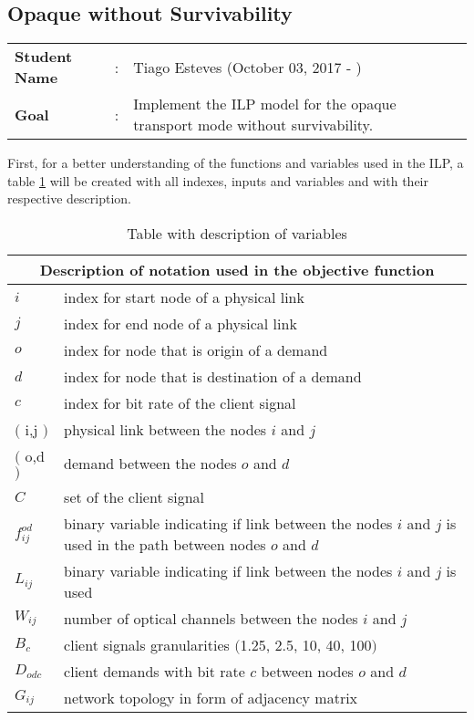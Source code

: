 \clearpage

\subsection{Opaque without Survivability}\label{ILP_Opaque_Survivability}
\begin{tcolorbox}	
\begin{tabular}{p{2.75cm} p{0.2cm} p{10.5cm}} 	
\textbf{Student Name}  &:& Tiago Esteves    (October 03, 2017 - )\\
\textbf{Goal}          &:& Implement the ILP model for the opaque transport mode without survivability.
\end{tabular}
\end{tcolorbox}
\vspace{11pt}

First, for a better understanding of the functions and variables used in the ILP, a table \ref{description_opaque} will be created with all indexes, inputs and variables and with their respective description.\\

\begin{table}[h!]
\centering
\begin{tabular}{ |p{1cm}||p{13cm}|}
 \hline
 \multicolumn{2}{|c|}{Description of notation used in the objective function} \\
 \hline
 \hline
 $i$ & index for start node of a physical link \\
 $j$ & index for end node of a physical link \\
 $o$ & index for node that is origin of a demand \\
 $d$ & index for node that is destination of a demand \\
 $c$ & index for bit rate of the client signal \\
 $($ i,j $)$ & physical link between the nodes $i$ and $j$ \\
 $($ o,d $)$ & demand between the nodes $o$ and $d$ \\
 $C$ & set of the client signal \\
 $f_{ij}^{od}$ & binary variable indicating if link between the nodes $i$ and $j$ is used in the path between nodes $o$ and $d$ \\
 $L_{ij}$ & binary variable indicating if link between the nodes $i$ and $j$ is used \\
 $W_{ij}$ & number of optical channels between the nodes $i$ and $j$\\
 $B_c $ & client signals granularities $($1.25, 2.5, 10, 40, 100$)$ \\
 $D_{odc}$ & client demands with bit rate $c$ between nodes $o$ and $d$ \\
 $G_{ij}$ & network topology in form of adjacency matrix \\
 \hline
\end{tabular}
\caption{Table with description of variables}
\label{description_opaque}
\end{table}

